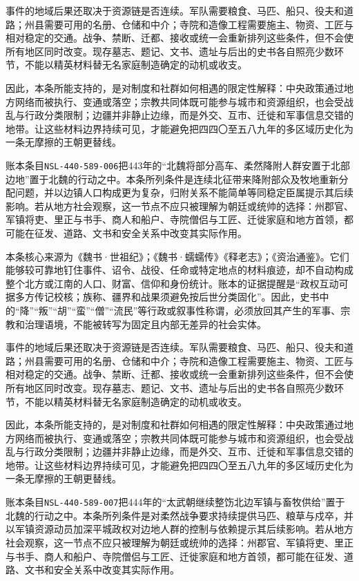 事件的地域后果还取决于资源链是否连续。军队需要粮食、马匹、船只、役夫和道路；州县需要可用的名册、仓储和中介；寺院和造像工程需要施主、物资、工匠与相对稳定的交通。战争、禁断、迁都、接收或统一会重新排列这些条件，但不会使所有地区同时改变。现存墓志、题记、文书、遗址与后出的史书各自照亮少数环节，不能以精英材料替无名家庭制造确定的动机或收支。

因此，本条所能支持的，是对制度和社群如何相遇的限定性解释：中央政策通过地方网络而被执行、变通或落空；宗教共同体既可能参与城市和资源组织，也会受战乱与行政分类限制；边疆并非静止边缘，而是外交、互市、迁徙和军事信息交错的地带。让这些材料边界持续可见，才能避免把四四〇至五八九年的多区域历史化为一条无摩擦的王朝更替线。

账本条目\texttt{NSL-440-589-006}把443年的“北魏将部分高车、柔然降附人群安置于北部边地”置于北魏的行动之中。本条所列条件是连续北征带来降附部众及牧地重新分配问题，并以边镇人口构成更为复杂，归附关系不能简单等同稳定臣属提示其后续影响。若从地方社会观察，这一节点不应只被理解为朝廷或统帅的选择：州郡官、军镇将吏、里正与书手、商人和船户、寺院僧侣与工匠、迁徙家庭和地方首领，都可能在征发、道路、文书和安全关系中改变其实际作用。

本条核心来源为《魏书·世祖纪》；《魏书·蠕蠕传》《释老志》；《资治通鉴》。它们能够较可靠地钉住事件、诏令、战役、任命或特定地点的材料痕迹，却不自动构成整个北方或江南的人口、财富、信仰和身份统计。账本的证据提醒是“政权互动可据多方传记校核；族称、疆界和战果须避免按后世分类固化”。因此，史书中的“降”“叛”“胡”“蛮”“僧”“流民”等行政或叙事性称谓，必须放回其产生的军事、宗教和治理语境，不能被转写为固定且内部无差异的社会实体。

事件的地域后果还取决于资源链是否连续。军队需要粮食、马匹、船只、役夫和道路；州县需要可用的名册、仓储和中介；寺院和造像工程需要施主、物资、工匠与相对稳定的交通。战争、禁断、迁都、接收或统一会重新排列这些条件，但不会使所有地区同时改变。现存墓志、题记、文书、遗址与后出的史书各自照亮少数环节，不能以精英材料替无名家庭制造确定的动机或收支。

因此，本条所能支持的，是对制度和社群如何相遇的限定性解释：中央政策通过地方网络而被执行、变通或落空；宗教共同体既可能参与城市和资源组织，也会受战乱与行政分类限制；边疆并非静止边缘，而是外交、互市、迁徙和军事信息交错的地带。让这些材料边界持续可见，才能避免把四四〇至五八九年的多区域历史化为一条无摩擦的王朝更替线。

账本条目\texttt{NSL-440-589-007}把444年的“太武朝继续整饬北边军镇与畜牧供给”置于北魏的行动之中。本条所列条件是对柔然战争要求持续提供马匹、粮草与戍卒，并以军镇资源动员加深平城政权对边地人群的控制与依赖提示其后续影响。若从地方社会观察，这一节点不应只被理解为朝廷或统帅的选择：州郡官、军镇将吏、里正与书手、商人和船户、寺院僧侣与工匠、迁徙家庭和地方首领，都可能在征发、道路、文书和安全关系中改变其实际作用。

